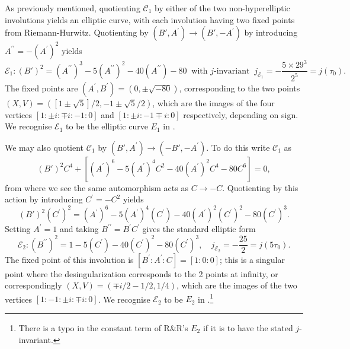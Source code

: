 \documentclass{amsart}
\newcommand{\psquare}[1]{\left[ #1 \right]}
\begin{document}
As previously mentioned, quotienting $\mathcal{C}_1$ by either of the two non-hyperelliptic involutions yields an elliptic curve, with each involution having two fixed points from Riemann-Hurwitz. Quotienting by $(B',A^\prime)\rightarrow (B',-A^\prime)$ by introducing $A^{\prime \prime} = -(A^\prime)^2$ yields
\begin{equation}
\label{qe1} 
\mathcal{E}_1: (B')^2=(A^{\prime \prime})^3-5 (A^{\prime \prime})^2 -40 (A^{\prime \prime}) -80\ \text{ with $j$-invariant } \ j_{\mathcal{E}_1 }=-\frac{5\times 29^3}{2^5} = j(\tau_0).
\end{equation}
The fixed points are $(A^\prime, B^\prime)=(0, \pm\sqrt{-80})$, corresponding to the two points $(X,V)=([1\pm \sqrt{5}]/2, -1\pm \sqrt{5}/2)$, which are the images of the four vertices $[1: \pm i : \mp i : -1 : 0]$ and $[1: \pm i : -1 \mp i : 0]$ respectively, depending on sign. We recognise $\mathcal{E}_1$ to be the elliptic curve $E_1$ in \cite{Riera1992}.


We may also quotient $\mathcal{C}_1$ by
$(B', A^\prime)\rightarrow (-B', -A^\prime)$. To do this write $\mathcal{C}_1$ as 
$$
(B')^2 C^4 + \psquare{(A^\prime)^6-5 (A^\prime)^4 C^2 -40 (A^\prime)^2 C^4 -80 C^6} = 0  , 
$$
from where we see the same automorphism acts as $C \to -C$. Quotienting by this action by introducing $C^\prime = -C^2$ yields 
$$
(B')^2 (C^\prime)^2 =(A^\prime)^6-5 (A^\prime)^4 (C^\prime) -40 (A^\prime)^2 (C^\prime)^2 -80 (C^\prime)^3  . 
$$
Setting $A^\prime=1$ and taking $B^{\prime \prime} =  B^\prime C^\prime$ gives the standard elliptic form
\begin{equation}
\label{qe2} 
\mathcal{E}_2: (B^{\prime \prime})^2 =  1-5  (C^\prime) -40  (C^\prime)^2 -80 (C^\prime)^3 , \quad j_{\mathcal{E}_2 }=-\frac{25}{2} = j(5\tau_0). 
\end{equation}
The fixed point of this involution is $[B^\prime : A^\prime : C] = [1:0:0]$; this is a singular point where the desingularization corresponds to the 2 points at infinity, or correspondingly $(X,V)=(\mp i/2-1/2, 1/4)$, which are the images of the two vertices $[1:-1: \pm i : \mp i : 0]$. We recognise $\mathcal{E}_2$ to be $E_2$ in \cite{Riera1992}.\footnote{There is a typo in the constant term of R\&R's $E_2$ if it is to have the stated $j$-invariant.}
\end{document}
